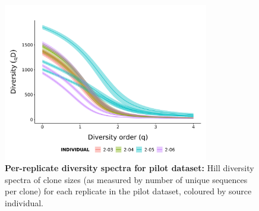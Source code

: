 \begin{figure}
\centering
\includegraphics[width = 0.8\textwidth]{_Figures/png/pilot-clone-diversity-solo-spectra}
\caption{\textbf{Per-replicate diversity spectra for pilot dataset:} Hill diversity spectra of clone sizes (as measured by number of unique sequences per clone) for each replicate in the \igseq pilot dataset, coloured by source individual.}
\label{fig:igseq-pilot-clone-diversity-solo-spectra}
\end{figure} %



